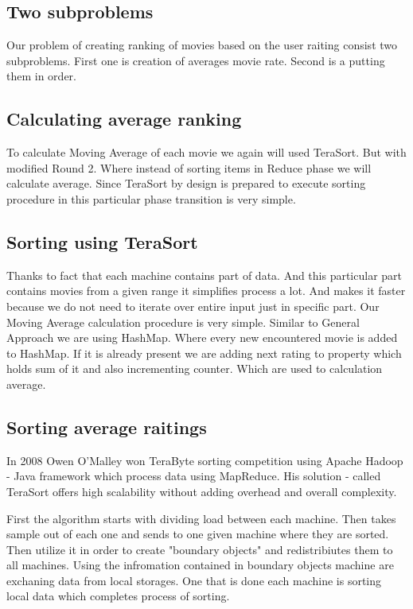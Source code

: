 \subsection{Two subproblems}
Our problem of creating ranking of movies based on the user raiting 
consist two subproblems. First one is creation of averages movie rate.
Second is a putting them in order. 

\subsection{Calculating average ranking}
To calculate Moving Average of each movie we again will used TeraSort.
But with modified Round 2. Where instead of sorting items in Reduce phase
we will calculate average. Since TeraSort by design is prepared to execute
sorting procedure in this particular phase transition is very simple.

\subsection{Sorting using TeraSort}
Thanks to fact that each machine contains part of data. And this particular part contains movies from
a given range it simplifies process a lot. And makes it faster because we do not need to iterate over entire
input just in specific part.
Our Moving Average calculation procedure is very simple. Similar to General Approach
we are using HashMap. Where every new encountered movie is added to HashMap. If it is already
present we are adding next rating to property which holds sum of it and also incrementing counter.
Which are used to calculation average.

\subsection{Sorting average raitings}
In 2008 Owen O'Malley won TeraByte sorting competition using Apache Hadoop
- Java framework which process data using MapReduce. His solution - called TeraSort offers
high scalability without adding overhead and overall complexity.

First the algorithm starts with dividing load between each machine. Then takes sample 
out of each one and sends to one given machine where they are sorted.
Then utilize it in order to create "boundary objects" and redistribiutes them
to all machines. Using the infromation contained in boundary objects 
machine are exchaning data from local storages.
One that is done each machine is sorting local data which completes process of sorting.

